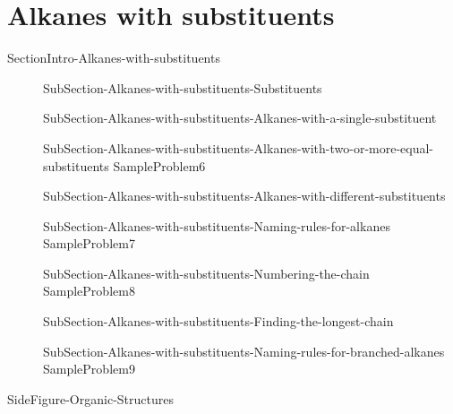 \documentclass[main.tex]{subfiles}
\newcommand\chapterlabel{Ch-orgo}\setcounter{figurenewcounter}{0}\setcounter{tablenewcounter}{0}\setcounter{formulanewcounter}{0}
\begin{document}
 
\section{Alkanes with substituents}{SectionIntro-Alkanes-with-substituents}
\sloppy\begin{description}
\item[]{SubSection-Alkanes-with-substituents-Substituents}
\item[]{SubSection-Alkanes-with-substituents-Alkanes-with-a-single-substituent}
\newpage\hspace{-3cm}{Table-Substituents}
\item[]{SubSection-Alkanes-with-substituents-Alkanes-with-two-or-more-equal-substituents}
{SampleProblem6}
\item[]{SubSection-Alkanes-with-substituents-Alkanes-with-different-substituents}
\item[]{SubSection-Alkanes-with-substituents-Naming-rules-for-alkanes}
{SampleProblem7}
\item[]{SubSection-Alkanes-with-substituents-Numbering-the-chain}
{SampleProblem8}
\item[]{SubSection-Alkanes-with-substituents-Finding-the-longest-chain}
\item[]{SubSection-Alkanes-with-substituents-Naming-rules-for-branched-alkanes}
{SampleProblem9}
\end{description}



{SideFigure-Organic-Structures}
\end{document}
